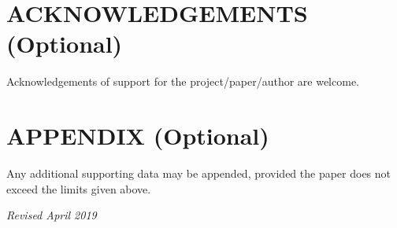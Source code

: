 \documentclass{isprs} %
\begin{document}
\section*{ACKNOWLEDGEMENTS (Optional)}\label{ACKNOWLEDGEMENTS}
Acknowledgements of support for the project/paper/author are welcome. 

{
	\begin{spacing}{1.17}
		\normalsize
	\end{spacing}
}


\section*{APPENDIX (Optional)}\label{APPENDIX}

Any additional supporting data may be appended, provided the paper does not exceed the limits given above. 

\vspace{1cm}
\textit{Revised April 2019}
\end{document}
